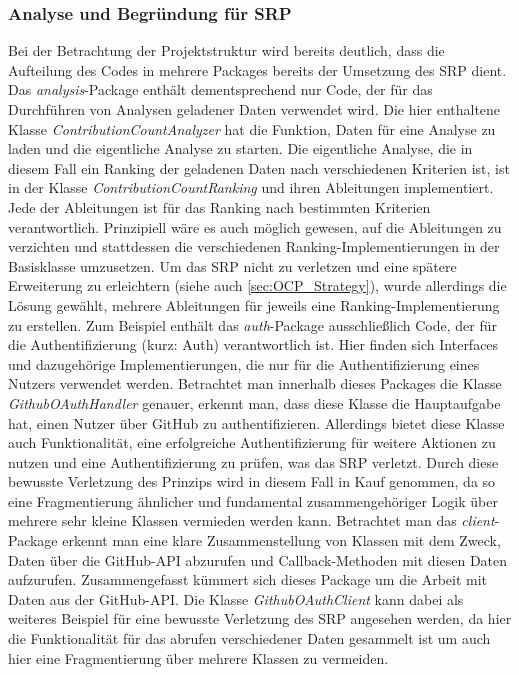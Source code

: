 \subsubsection{Analyse und Begründung für SRP}
\label{sec:Analyse_SRP}
Bei der Betrachtung der Projektstruktur wird bereits deutlich, dass die Aufteilung des Codes in mehrere Packages bereits der Umsetzung des SRP dient.
Das \textit{analysis}-Package enthält dementsprechend nur Code, der für das Durchführen von Analysen geladener Daten verwendet wird.
Die hier enthaltene Klasse \textit{ContributionCountAnalyzer} hat die Funktion, Daten für eine Analyse zu laden und die eigentliche Analyse zu starten.
Die eigentliche Analyse, die in diesem Fall ein Ranking der geladenen Daten nach verschiedenen Kriterien ist, ist in der Klasse \textit{ContributionCountRanking} und ihren Ableitungen implementiert.
Jede der Ableitungen ist für das Ranking nach bestimmten Kriterien verantwortlich.
Prinzipiell wäre es auch möglich gewesen, auf die Ableitungen zu verzichten und stattdessen die verschiedenen Ranking-Implementierungen in der Basisklasse umzusetzen.
Um das SRP nicht zu verletzen und eine spätere Erweiterung zu erleichtern (siehe auch \ref{sec:OCP_Strategy}), wurde allerdings die Lösung gewählt, mehrere Ableitungen für jeweils eine Ranking-Implementierung zu erstellen. 
\newline
Zum Beispiel enthält das \textit{auth}-Package ausschließlich Code, der für die Authentifizierung (kurz: Auth) verantwortlich ist.
Hier finden sich Interfaces und dazugehörige Implementierungen, die nur für die Authentifizierung eines Nutzers verwendet werden.
Betrachtet man innerhalb dieses Packages die Klasse \textit{GithubOAuthHandler} genauer, erkennt man, dass diese Klasse die Hauptaufgabe hat, einen Nutzer über GitHub zu authentifizieren.
Allerdings bietet diese Klasse auch Funktionalität, eine erfolgreiche Authentifizierung für weitere Aktionen zu nutzen und eine Authentifizierung zu prüfen, was das SRP verletzt.
Durch diese bewusste Verletzung des Prinzips wird in diesem Fall  in Kauf genommen, da so eine Fragmentierung ähnlicher und fundamental zusammengehöriger Logik über mehrere sehr kleine Klassen vermieden werden kann.
\newline
Betrachtet man das \textit{client}-Package erkennt man eine klare Zusammenstellung von Klassen mit dem Zweck, Daten über die GitHub-API abzurufen und Callback-Methoden mit diesen Daten aufzurufen.
Zusammengefasst kümmert sich dieses Package um die Arbeit mit Daten aus der GitHub-API.
Die Klasse \textit{GithubOAuthClient} kann dabei als weiteres Beispiel für eine bewusste Verletzung des SRP angesehen werden, da hier die Funktionalität für das abrufen verschiedener Daten gesammelt ist um auch hier eine Fragmentierung über mehrere Klassen zu vermeiden. 
